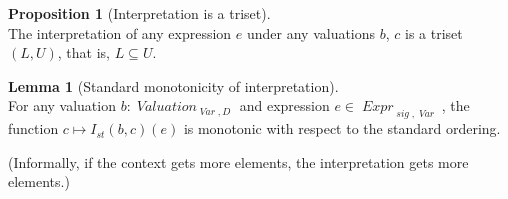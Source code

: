 \documentclass[oneside,12pt]{book}
\theoremstyle{definition}
\newtheorem{lemma}[theorem]{Lemma}
\newtheorem{proposition}[theorem]{Proposition}
\theoremstyle{remark}
\newcommand\var[1]{\mathop{\mathit{#1}}\nolimits}
\newcommand{\sig}{\var{sig}}
\newcommand{\st}{\var{st}}
\newcommand{\Var}{\var{Var}}
\newcommand{\Valuation}{\var{Valuation}}
\newcommand{\Expr}{\var{Expr}}
\begin{document}
\begin{proposition}[Interpretation is a triset] \hfill \\
  The interpretation of any expression $e$ under any valuations $b$, $c$
  is a triset $(L, U)$, that is, $L \subseteq U$.
\end{proposition}

\begin{lemma}[Standard monotonicity of interpretation]\label{monoInterpStd} \hfill \\
  For any valuation $b\colon \Valuation_{\Var,D}$ and expression
  $e \in \Expr_{\sig,\Var}$, the function $c \mapsto I_{\st}(b, c)(e)$
  is monotonic with respect to the standard ordering.
  
  (Informally, if the context gets more elements, the interpretation
  gets more elements.)
\end{lemma}
\end{document}
